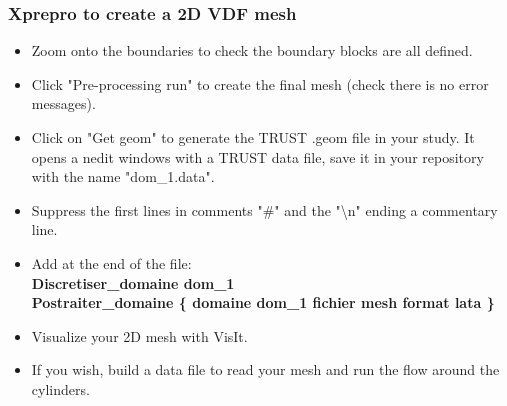 \documentclass[10pt]{beamer}
\begin{document}
\begin{frame}
\frametitle{Xprepro to create a 2D VDF mesh}
\begin{block}{}

\begin{itemize}
\item Zoom onto the boundaries to check the boundary blocks are all defined.

\item Click "Pre-processing run" to create the final mesh (check there is no error messages).

\item Click on "Get geom" to generate the TRUST .geom file in your study. It opens a nedit windows with a TRUST data file, save it in your repository with the name "dom\_1.data".
\item Suppress the first lines in comments "\#" and the "\textbackslash{}n" ending a commentary line.
\item Add at the end of the file:\\
\textbf{Discretiser\_domaine dom\_1} \\
\textbf{Postraiter\_domaine \{ domaine dom\_1 fichier mesh format lata \} }
\item Visualize your 2D mesh with VisIt.
\item If you wish, build a data file to read your mesh and run the flow around the cylinders.
\end{itemize}

\end{block}
\end{frame}
\end{document}
